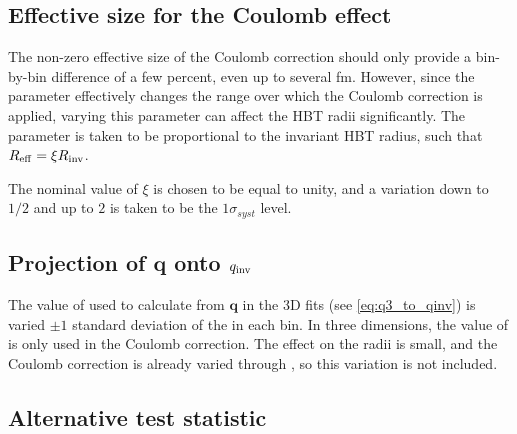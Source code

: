 \subsection{Effective size for the Coulomb effect}
The non-zero effective size of the Coulomb correction \Reff should only provide a bin-by-bin difference of a few percent, even up to several fm.
However, since the parameter effectively changes the \qinv range over which the Coulomb correction is applied, varying this parameter can affect the HBT radii significantly.
The parameter \Reff is taken to be proportional to the invariant HBT radius, such that $R_{\mathrm{eff}} = \xi R_{\mathrm{inv}}$.

The nominal value of $\xi$ is chosen to be equal to unity, and a variation down to $1/2$ and up to $2$ is taken to be the $1\sigma_{syst}$ level.

\subsection{Projection of $\mathbf{q}$ onto $q_{\mathrm{inv}}$}
The value of \kt used to calculate \qinv from $\mathbf{q}$ in the 3D fits (see \cref{eq:q3_to_qinv}) is varied $\pm 1$ standard deviation of the \kt in each bin.
In three dimensions, the value of \qinv is only used in the Coulomb correction.
The effect on the radii is small, and the Coulomb correction is already varied through \Reff, so this variation is not included.


\subsection{Alternative test statistic}

